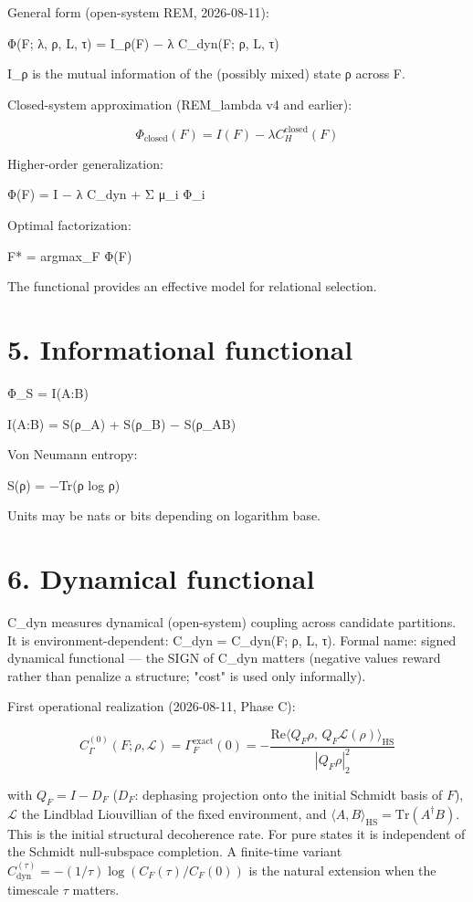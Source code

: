 \documentclass[
]{article}
\begin{document}
General form (open-system REM, 2026-08-11):

Φ(F; λ, ρ, L, τ) = I\_ρ(F) − λ C\_dyn(F; ρ, L, τ)

I\_ρ is the mutual information of the (possibly mixed) state ρ across F.

Closed-system approximation (REM\_lambda v4 and earlier):

\[
\Phi_{\mathrm{closed}}(F) = I(F) - \lambda C_H^{\mathrm{closed}}(F)
\]

Higher-order generalization:

Φ(F) = I − λ C\_dyn + Σ μ\_i Φ\_i

Optimal factorization:

F* = argmax\_F Φ(F)

The functional provides an effective model for relational selection.

\section{5. Informational functional}\label{informational-functional}

Φ\_S = I(A:B)

I(A:B) = S(ρ\_A) + S(ρ\_B) − S(ρ\_AB)

Von Neumann entropy:

S(ρ) = −Tr(ρ log ρ)

Units may be nats or bits depending on logarithm base.

\section{6. Dynamical functional}\label{dynamical-functional}

C\_dyn measures dynamical (open-system) coupling across candidate
partitions. It is environment-dependent: C\_dyn = C\_dyn(F; ρ, L, τ).
Formal name: signed dynamical functional — the SIGN of C\_dyn matters
(negative values reward rather than penalize a structure; "cost" is used
only informally).

First operational realization (2026-08-11, Phase C):

\[
C_\Gamma^{(0)}(F;\rho,\mathcal L)
= \Gamma_F^{\mathrm{exact}}(0)
= -\frac{\mathrm{Re}\langle Q_F\rho,\,Q_F\mathcal L(\rho)\rangle_{\mathrm{HS}}}{|Q_F\rho|_2^2}
\]

with $Q_F = I - D_F$ ($D_F$: dephasing projection onto the initial Schmidt
basis of $F$), $\mathcal L$ the Lindblad Liouvillian of the fixed
environment, and $\langle A,B\rangle_{\mathrm{HS}} = \mathrm{Tr}(A^\dagger B)$.
This is the initial structural decoherence rate.
For pure states it is independent of the Schmidt null-subspace completion.
A finite-time variant $C_{\mathrm{dyn}}^{(\tau)} = -(1/\tau)\log(C_F(\tau)/C_F(0))$
is the natural extension when the timescale $\tau$ matters.
\end{document}
